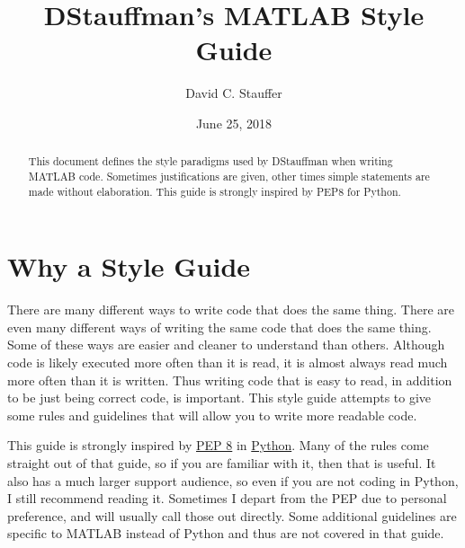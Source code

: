 \documentclass[12pt]{article}
\begin{document}
\title{DStauffman's MATLAB Style Guide}
\author{David C. Stauffer}
\date{June 25, 2018}
\maketitle

\begin{abstract}\label{Abstract}
This document defines the style paradigms used by DStauffman when writing MATLAB code.  Sometimes justifications are given, other times simple statements are made without elaboration.  This guide is strongly inspired by PEP8 for Python.
\end{abstract}

\begin{versionhistory}
\end{versionhistory}

\pagebreak
\tableofcontents
{}

\pagebreak
\listoffigures
{}
\listoftables
{}

\pagebreak
\section{Why a Style Guide}\label{h1:why_style_guide}
There are many different ways to write code that does the same thing.  There are even many different ways of writing the same code that does the same thing.  Some of these ways are easier and cleaner to understand than others.  Although code is likely executed more often than it is read, it is almost always read much more often than it is written.  Thus writing code that is easy to read, in addition to be just being correct code, is important.  This style guide attempts to give some rules and guidelines that will allow you to write more readable code.

This guide is strongly inspired by \href{https://www.python.org/dev/peps/pep-0008/}{PEP 8} in \href{https://www.python.org/}{Python}.  Many of the rules come straight out of that guide, so if you are familiar with it, then that is useful.  It also has a much larger support audience, so even if you are not coding in Python, I still recommend reading it.  Sometimes I depart from the PEP due to personal preference, and will usually call those out directly.  Some additional guidelines are specific to MATLAB instead of Python and thus are not covered in that guide.
\end{document}
